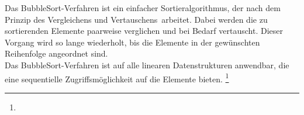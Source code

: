 \documentclass[./entry.tex]{subfiles}
\begin{document}

    Das \dq BubbleSort\dq-Verfahren ist ein einfacher Sortieralgorithmus,
    der nach dem Prinzip des \dq Vergleichens und Vertauschens\dq\ arbeitet.
    Dabei werden die zu sortierenden Elemente paarweise verglichen und bei Bedarf vertauscht.
    Dieser Vorgang wird so lange wiederholt, bis die Elemente in der gewünschten Reihenfolge angeordnet sind.\\
    Das \dq BubbleSort\dq-Verfahren ist auf alle linearen Datenstrukturen anwendbar,
    die eine sequentielle Zugriffsmöglichkeit auf die Elemente bieten.
    \footnote{}
\end{document}
